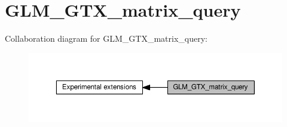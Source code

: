 \hypertarget{group__gtx__matrix__query}{}\section{G\+L\+M\+\_\+\+G\+T\+X\+\_\+matrix\+\_\+query}
\label{group__gtx__matrix__query}
Collaboration diagram for G\+L\+M\+\_\+\+G\+T\+X\+\_\+matrix\+\_\+query\+:
\nopagebreak
\begin{figure}[H]
\begin{center}
\leavevmode
\includegraphics[width=350pt]{df/d21/group__gtx__matrix__query}
\end{center}
\end{figure}
